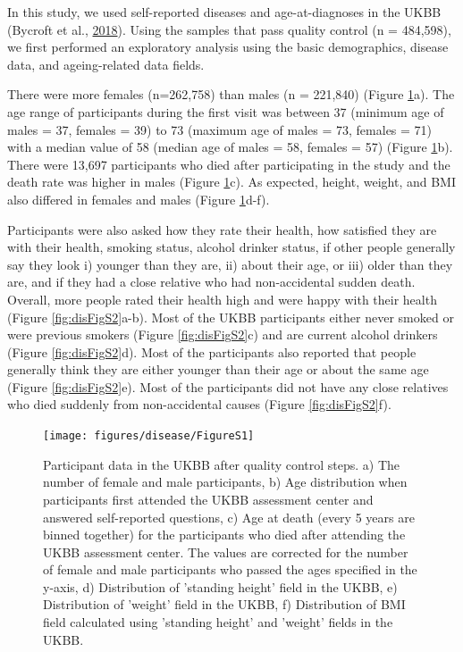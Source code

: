 \documentclass[12pt,twoside]{unicam}
\begin{document}
In this study, we used self-reported diseases and age-at-diagnoses in the UKBB (Bycroft et al., \protect\hyperlink{ref-Bycroft2018}{2018}). Using the samples that pass quality control (n = 484,598), we first performed an exploratory analysis using the basic demographics, disease data, and ageing-related data fields.

There were more females (n=262,758) than males (n = 221,840) (Figure \ref{fig:disFigS1}a). The age range of participants during the first visit was between 37 (minimum age of males = 37, females = 39) to 73 (maximum age of males = 73, females = 71) with a median value of 58 (median age of males = 58, females = 57) (Figure \ref{fig:disFigS1}b). There were 13,697 participants who died after participating in the study and the death rate was higher in males (Figure \ref{fig:disFigS1}c). As expected, height, weight, and BMI also differed in females and males (Figure \ref{fig:disFigS1}d-f).

Participants were also asked how they rate their health, how satisfied they are with their health, smoking status, alcohol drinker status, if other people generally say they look i) younger than they are, ii) about their age, or iii) older than they are, and if they had a close relative who had non-accidental sudden death. Overall, more people rated their health high and were happy with their health (Figure \ref{fig:disFigS2}a-b). Most of the UKBB participants either never smoked or were previous smokers (Figure \ref{fig:disFigS2}c) and are current alcohol drinkers (Figure \ref{fig:disFigS2}d). Most of the participants also reported that people generally think they are either younger than their age or about the same age (Figure \ref{fig:disFigS2}e). Most of the participants did not have any close relatives who died suddenly from non-accidental causes (Figure \ref{fig:disFigS2}f).

\begin{figure}

{\centering \texttt{[image: figures/disease/FigureS1]} 

}

\caption[Participant data in the UKBB after quality control steps.]{Participant data in the UKBB after quality control steps. a) The number of female and male participants, b) Age distribution when participants first attended the UKBB assessment center and answered self-reported questions, c) Age at death (every 5 years are binned together) for the participants who died after attending the UKBB assessment center. The values are corrected for the number of female and male participants who passed the ages specified in the y-axis, d) Distribution of 'standing height' field in the UKBB, e) Distribution of 'weight' field in the UKBB, f) Distribution of BMI field calculated using 'standing height' and 'weight' fields in the UKBB.}\label{fig:disFigS1}
\end{figure}
\end{document}
